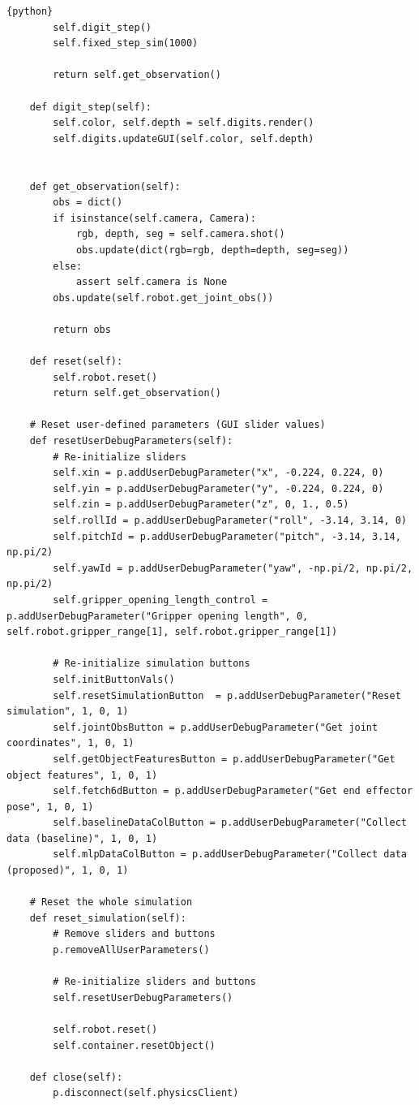 \documentclass[11pt, a4paper]{report}
\begin{document}
\begin{lstlisting}{python}
        self.digit_step()
        self.fixed_step_sim(1000)
        
        return self.get_observation()

    def digit_step(self):
        self.color, self.depth = self.digits.render()
        self.digits.updateGUI(self.color, self.depth)


    def get_observation(self):
        obs = dict()
        if isinstance(self.camera, Camera):
            rgb, depth, seg = self.camera.shot()
            obs.update(dict(rgb=rgb, depth=depth, seg=seg))
        else:
            assert self.camera is None
        obs.update(self.robot.get_joint_obs())

        return obs

    def reset(self):
        self.robot.reset()
        return self.get_observation()
    
    # Reset user-defined parameters (GUI slider values)
    def resetUserDebugParameters(self):
        # Re-initialize sliders        
        self.xin = p.addUserDebugParameter("x", -0.224, 0.224, 0)
        self.yin = p.addUserDebugParameter("y", -0.224, 0.224, 0)
        self.zin = p.addUserDebugParameter("z", 0, 1., 0.5)
        self.rollId = p.addUserDebugParameter("roll", -3.14, 3.14, 0)
        self.pitchId = p.addUserDebugParameter("pitch", -3.14, 3.14, np.pi/2)
        self.yawId = p.addUserDebugParameter("yaw", -np.pi/2, np.pi/2, np.pi/2)
        self.gripper_opening_length_control = p.addUserDebugParameter("Gripper opening length", 0, self.robot.gripper_range[1], self.robot.gripper_range[1])
        
        # Re-initialize simulation buttons
        self.initButtonVals()
        self.resetSimulationButton  = p.addUserDebugParameter("Reset simulation", 1, 0, 1)
        self.jointObsButton = p.addUserDebugParameter("Get joint coordinates", 1, 0, 1)
        self.getObjectFeaturesButton = p.addUserDebugParameter("Get object features", 1, 0, 1)
        self.fetch6dButton = p.addUserDebugParameter("Get end effector pose", 1, 0, 1)
        self.baselineDataColButton = p.addUserDebugParameter("Collect data (baseline)", 1, 0, 1)
        self.mlpDataColButton = p.addUserDebugParameter("Collect data (proposed)", 1, 0, 1)

    # Reset the whole simulation
    def reset_simulation(self):
        # Remove sliders and buttons
        p.removeAllUserParameters()

        # Re-initialize sliders and buttons
        self.resetUserDebugParameters()

        self.robot.reset()
        self.container.resetObject()

    def close(self):
        p.disconnect(self.physicsClient)
\end{lstlisting}
\end{document}
